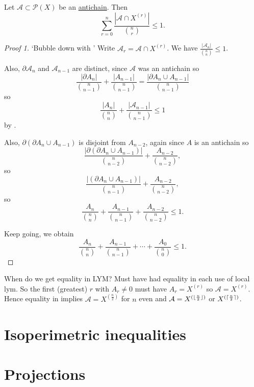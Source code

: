 \documentclass{article}
\DeclarePairedDelimiter\ceil{\lceil}{\rceil}
\DeclarePairedDelimiter\floor{\lfloor}{\rfloor}
\begin{document}
\begin{nthm}\label{thm:lym}
  Let $\mathcal{A} \subset \mathcal{P}(X)$ be an \hyperlink{def:antichain}{antichain}.
  Then
  \begin{equation*}
    \sum_{r=0}^n \frac{|\mathcal{A} \cap X^{(r)}|}{\binom{n}{r}} \leq 1.
  \end{equation*}
\end{nthm}
\begin{proof}[Proof 1]
  `Bubble down with '
  Write $\mathcal{A}_r = \mathcal{A} \cap X^{(r)}$.
  We have $\frac{|\mathcal{A}_n|}{\binom{n}{n}} \leq 1$.

  Also, $\partial \mathcal{A}_n$ and $\mathcal{A}_{n-1}$ are distinct, since $\mathcal{A}$ was an antichain so
  \begin{equation*}
    \frac{|\partial A_n|}{\binom{n}{n-1}} + \frac{|A_{n-1}|}{\binom{n}{n-1}} = \frac{|\partial A_n \cup A_{n-1}|}{\binom{n}{n-1}}
  \end{equation*}
  so
  \begin{equation*}
    \frac{|A_n|}{\binom{n}{n}} + \frac{|\mathcal{A}_{n-1}|}{\binom{n}{n-1}} \leq 1
  \end{equation*}
  by .

  Also, $\partial(\partial A_n \cup A_{n-1})$ is disjoint from $A_{n-2}$, again since $A$ is an antichain so
  \begin{equation*}
    \frac{|\partial(\partial A_n \cup A_{n-1})|}{\binom{n}{n-2}} + \frac{A_{n-2}}{{n \choose n-2}},
  \end{equation*}
  so
  \begin{equation*}
    \frac{|(\partial A_n \cup A_{n-1})|}{\binom{n}{n-1}} + \frac{A_{n-2}}{{n \choose n-2}},
  \end{equation*}
  so
  \begin{equation*}
    \frac{A_n}{\binom{n}{n}} + \frac{A_{n-1}}{\binom{n}{n-1}} + \frac{A_{n-2}}{\binom{n}{n-2}} \leq 1.
  \end{equation*}

  Keep going, we obtain
  \begin{equation*}
    \frac{A_n}{\binom{n}{n}} + \frac{A_{n-1}}{\binom{n}{n-1}} + \dotsm + \frac{A_0}{\binom{n}{0}} \leq 1.
  \end{equation*}
\end{proof}

When do we get equality in LYM? Must have had equality in each use of local lym.
So the first (greatest) $r$ with $A_r \neq 0$ must have $A_r = X^{(r)}$ so $\mathcal{A} = X^{(r)}$.
Hence equality in  implies $\mathcal{A} = X^{(\frac{n}{2})}$ for $n$ even and $\mathcal{A} = X^{(\floor{\frac{n}{2}})}$ or $X^{(\ceil{\frac{n}{2}})}$.
\section{Isoperimetric inequalities}
\section{Projections}
\printindex
\end{document}
